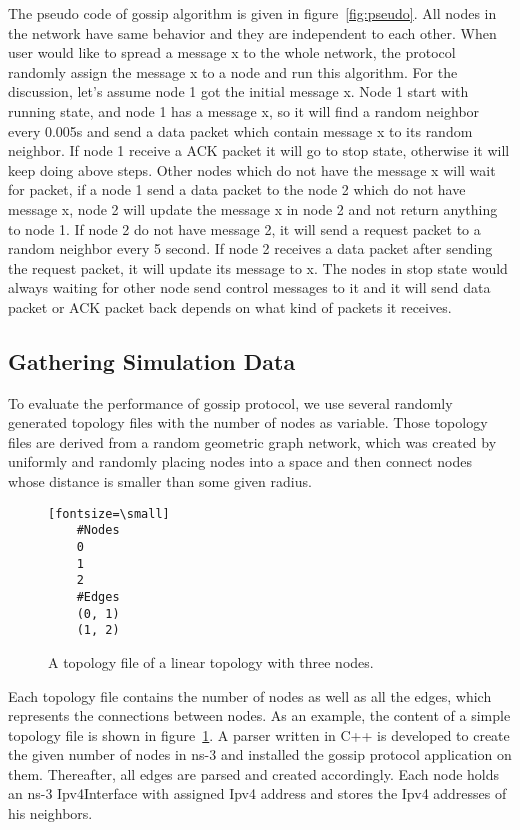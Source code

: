 The pseudo code of gossip algorithm is given in figure~\ref{fig:pseudo}. All nodes in the network have same behavior and they are independent to each other. When user would like to spread a message x to the whole network, the protocol randomly assign the message x to a node and run this algorithm. For the discussion, let's assume node 1 got the initial message x. Node 1 start with running state, and node 1 has a message x, so it will find a random neighbor every 0.005s and send a data packet which contain message x to its random neighbor. If node 1 receive a ACK packet it will go to stop state, otherwise it will keep doing above steps. Other nodes which do not have the message x will wait for packet, if a node 1 send a data packet to the node 2 which do not have message x, node 2 will update the message x in node 2 and not return anything to node 1. If node 2 do not have message 2, it will send a request packet to a random neighbor every 5 second. If node 2 receives a data packet after sending the request packet, it will update its message to x. The nodes in stop state would always waiting for other node send control messages to it and it will send data packet or ACK packet back depends on what kind of packets it receives.

\subsection{Gathering Simulation Data}

To evaluate the performance of gossip protocol, we use several randomly generated topology files with the number of nodes as variable. Those topology files are derived from a random geometric graph network, which was created by uniformly and randomly placing nodes into a space and then connect nodes whose distance is smaller than some given radius.

\begin{figure}
	\centering
	\begin{verbatim}[fontsize=\small]
	#Nodes
	0
	1
	2
	#Edges
	(0, 1)
	(1, 2)
	\end{verbatim}
	\caption{A topology file of a linear topology with three nodes.}
	\label{fig:topsimple}
\end{figure}


Each topology file contains the number of nodes as well as all the edges, which represents the connections between nodes. As an example, the content of a simple topology file is shown in figure~\ref{fig:topsimple}. A parser written in C++ is developed to create the given number of nodes in ns-3 and installed the gossip protocol application on them. Thereafter, all edges are parsed and created accordingly. Each node holds an ns-3 Ipv4Interface with assigned Ipv4 address and stores the Ipv4 addresses of his neighbors.

